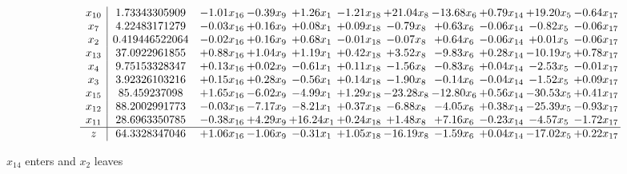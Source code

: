 \documentclass[9pt]{article}
\begin{document}
 \[\begin{array}{c| c c@{\hskip 2pt} c@{\hskip 2pt} c@{\hskip 2pt} c@{\hskip 2pt} c@{\hskip 2pt} c@{\hskip 2pt} c@{\hskip 2pt} c@{\hskip 2pt} c@{\hskip 2pt} }
 x_{10}   &  1.73343305909 & -1.01 x_{16} & -0.39 x_{9} & +  1.26 x_{1} & -1.21 x_{18} & + 21.04 x_{8} & -13.68 x_{6} & +  0.79 x_{14} & + 19.20 x_{5} & -0.64 x_{17}\\
 x_{7}   &  4.22483171279 & -0.03 x_{16} & +  0.16 x_{9} & +  0.08 x_{1} & +  0.09 x_{18} & -0.79 x_{8} & +  0.63 x_{6} & -0.06 x_{14} & -0.82 x_{5} & -0.06 x_{17}\\
 x_{2}   &  0.419446522064 & -0.02 x_{16} & +  0.16 x_{9} & +  0.68 x_{1} & -0.01 x_{18} & -0.07 x_{8} & +  0.64 x_{6} & -0.06 x_{14} & +  0.01 x_{5} & -0.06 x_{17}\\
 x_{13}   &  37.0922961855 & +  0.88 x_{16} & +  1.04 x_{9} & +  1.19 x_{1} & +  0.42 x_{18} & +  3.52 x_{8} & -9.83 x_{6} & +  0.28 x_{14} & -10.19 x_{5} & +  0.78 x_{17}\\
 x_{4}   &  9.75153328347 & +  0.13 x_{16} & +  0.02 x_{9} & -0.61 x_{1} & +  0.11 x_{18} & -1.56 x_{8} & -0.83 x_{6} & +  0.04 x_{14} & -2.53 x_{5} & -0.01 x_{17}\\
 x_{3}   &  3.92326103216 & +  0.15 x_{16} & +  0.28 x_{9} & -0.56 x_{1} & +  0.14 x_{18} & -1.90 x_{8} & -0.14 x_{6} & -0.04 x_{14} & -1.52 x_{5} & +  0.09 x_{17}\\
 x_{15}   &  85.459237098 & +  1.65 x_{16} & -6.02 x_{9} & -4.99 x_{1} & +  1.29 x_{18} & -23.28 x_{8} & -12.80 x_{6} & +  0.56 x_{14} & -30.53 x_{5} & +  0.41 x_{17}\\
 x_{12}   &  88.2002991773 & -0.03 x_{16} & -7.17 x_{9} & -8.21 x_{1} & +  0.37 x_{18} & -6.88 x_{8} & -4.05 x_{6} & +  0.38 x_{14} & -25.39 x_{5} & -0.93 x_{17}\\
 x_{11}   &  28.6963350785 & -0.38 x_{16} & +  4.29 x_{9} & + 16.24 x_{1} & +  0.24 x_{18} & +  1.48 x_{8} & +  7.16 x_{6} & -0.23 x_{14} & -4.57 x_{5} & -1.72 x_{17}\\
\hline
z    &  64.3328347046 & +  1.06 x_{16} & -1.06 x_{9} & -0.31 x_{1} & +  1.05 x_{18} & -16.19 x_{8} & -1.59 x_{6} & +  0.04 x_{14} & -17.02 x_{5} & +  0.22 x_{17}\\
\end{array}\]


 $ x_{14} $ enters and $ x_{2} $ leaves 
\end{document}
